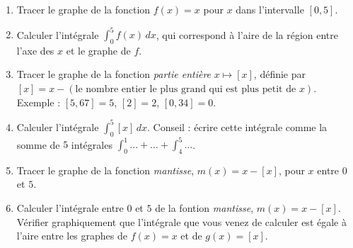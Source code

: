 \begin{exercice}\label{exoExamen-0001}
  \begin{enumerate}
  \item Tracer le graphe de la fonction $f(x)=x$ pour $x$ dans l'intervalle $[0,5]$.
    \item Calculer l'intégrale $\displaystyle \int_{0}^{5} f(x)\, dx$, qui correspond à l'aire de la région entre l'axe des $x$ et le graphe de $f$.
      \item Tracer le graphe de la fonction \emph{partie entière} $x\mapsto [x]$, définie par $[x]=x-(\textrm{le nombre entier le plus grand qui est plus petit de } x)$. Exemple : $[5,67]=5$, $[2]=2$, $[0,34]=0$.
        \item Calculer l'intégrale $\displaystyle \int_{0}^{5} [x]\, dx$. Conseil : écrire cette intégrale comme la somme de $5$ intégrales $\int_{0}^{1}\ldots+ \ldots +\int_{4}^{5}\ldots$. 
          \item Tracer le graphe de la fonction \emph{mantisse}, $m(x)=x-[x]$, pour $x$ entre $0$ et $5$.
          \item Calculer l'intégrale entre $0$ et $5$ de la fontion \emph{mantisse}, $m(x)=x-[x]$. Vérifier graphiquement que l'intégrale que vous venez de calculer est égale à l'aire entre les graphes de $f(x)=x$ et de $g(x)=[x]$.
        \begin{equation}
          
        \end{equation}
  \end{enumerate}
\end{exercice}
